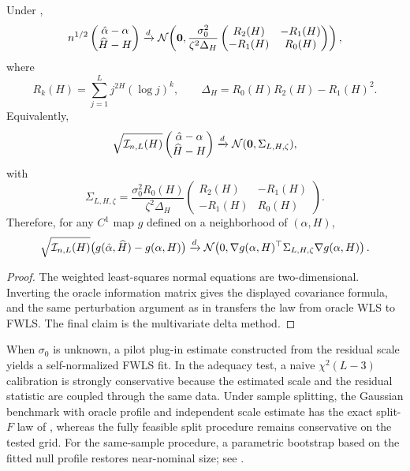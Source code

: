 \begin{corollary}
\label{cor:joint-law-smooth-functional}
Under ,
\[
  n^{1/2}
  \begin{pmatrix}
    \hat\alpha-\alpha \\
    \widehat{H}-H
  \end{pmatrix}
  \xrightarrow{d}
  \mathcal{N}\!\left(
    \mathbf 0,
    \frac{\sigma_0^2}{\zeta^2\Delta_H}
    \begin{pmatrix}
      R_2(H) & -R_1(H) \\
      -R_1(H) & R_0(H)
    \end{pmatrix}
  \right),
\]
where
\[
  R_k(H) = \sum_{j=1}^L j^{2H}(\log j)^k,
  \qquad
  \Delta_H = R_0(H)R_2(H)-R_1(H)^2.
\]
Equivalently,
\[
  \sqrt{\mathcal I_{n,L}(H)}
  \begin{pmatrix}
    \hat\alpha-\alpha \\
    \widehat{H}-H
  \end{pmatrix}
  \xrightarrow{d} \mathcal{N}(\mathbf 0,\Sigma_{L,H,\zeta}),
\]
with
\[
  \Sigma_{L,H,\zeta}
  =
  \frac{\sigma_0^2R_0(H)}{\zeta^2\Delta_H}
  \begin{pmatrix}
    R_2(H) & -R_1(H) \\
    -R_1(H) & R_0(H)
  \end{pmatrix}.
\]
Therefore, for any $C^1$ map $g$ defined on a neighborhood of
$(\alpha,H)$,
\[
  \sqrt{\mathcal I_{n,L}(H)}
  \bigl(g(\hat\alpha,\widehat{H})-g(\alpha,H)\bigr)
  \xrightarrow{d}
  \mathcal{N}\!\left(
    0,
    \nabla g(\alpha,H)^\top \Sigma_{L,H,\zeta}\nabla g(\alpha,H)
  \right).
\]
\end{corollary}

\begin{proof}
The weighted least-squares normal equations are two-dimensional. Inverting the
oracle information matrix gives the displayed covariance formula, and the same
perturbation argument as in  transfers the law from oracle WLS
to FWLS. The final claim is the multivariate delta method.
\end{proof}

\begin{remark}
    When $\sigma_0$ is unknown, a pilot plug-in estimate constructed from the
    residual scale yields a self-normalized FWLS fit. In the adequacy test,
    a naive $\chi^2(L-3)$ calibration is strongly conservative because the
    estimated scale and the residual statistic are coupled through the same
    data. Under sample splitting, the Gaussian benchmark with oracle profile and
    independent scale estimate has the exact split-$F$ law of
    , whereas the fully feasible split procedure
    remains conservative on the tested grid. For the same-sample procedure, a
    parametric bootstrap based on the fitted null profile restores near-nominal
    size; see .
\end{remark}

